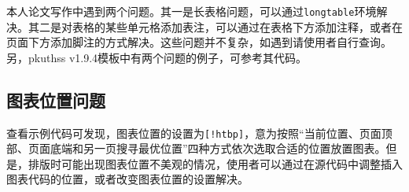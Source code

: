本人论文写作中遇到两个问题。其一是长表格问题，可以通过\texttt{longtable}环境解决。其二是对表格的某些单元格添加表注，可以通过在表格下方添加注释，或者在页面下方添加脚注的方式解决。这些问题并不复杂，如遇到请使用者自行查询。另，pkuthss v1.9.4模板中有两个问题的例子，可参考其代码。

\subsection{图表位置问题}

查看示例代码可发现，图表位置的设置为\texttt{[!htbp]}，意为按照“当前位置、页面顶部、页面底端和另一页搜寻最优位置”四种方式依次选取合适的位置放置图表。但是，排版时可能出现图表位置不美观的情况，使用者可以通过在源代码中调整插入图表代码的位置，或者改变图表位置的设置解决。